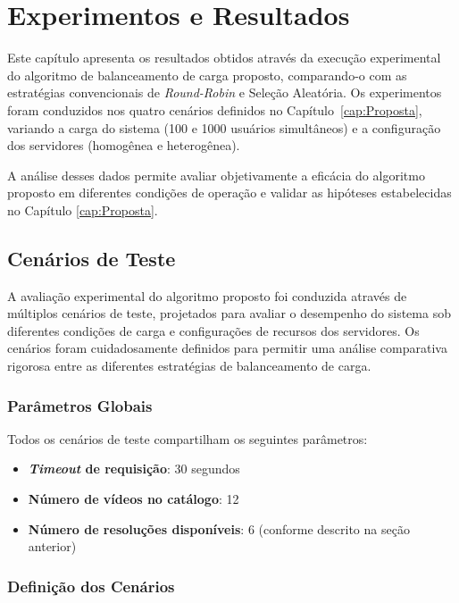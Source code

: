 \chapter{Experimentos e Resultados} \label{cap:ExperimentosEResultados}

Este capítulo apresenta os resultados obtidos através da execução experimental do algoritmo de balanceamento de carga proposto, comparando-o com as estratégias convencionais de \textit{Round-Robin} e Seleção Aleatória. Os experimentos foram conduzidos nos quatro cenários definidos no Capítulo~\ref{cap:Proposta}, variando a carga do sistema (100 e 1000 usuários simultâneos) e a configuração dos servidores (homogênea e heterogênea).

A análise desses dados permite avaliar objetivamente a eficácia do algoritmo proposto em diferentes condições de operação e validar as hipóteses estabelecidas no Capítulo \ref{cap:Proposta}.

\section{Cenários de Teste}

A avaliação experimental do algoritmo proposto foi conduzida através de múltiplos cenários de teste, projetados para avaliar o desempenho do sistema sob diferentes condições de carga e configurações de recursos dos servidores. Os cenários foram cuidadosamente definidos para permitir uma análise comparativa rigorosa entre as diferentes estratégias de balanceamento de carga.

\subsection{Parâmetros Globais}

Todos os cenários de teste compartilham os seguintes parâmetros:

\begin{itemize}
    \item \textbf{\textit{Timeout} de requisição}: 30 segundos
    \item \textbf{Número de vídeos no catálogo}: 12
    \item \textbf{Número de resoluções disponíveis}: 6 (conforme descrito na seção anterior)
\end{itemize}

\subsection{Definição dos Cenários}

